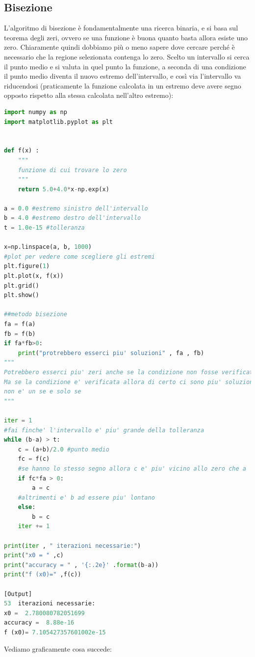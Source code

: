 \documentclass[10pt,a4paper]{article}
\begin{document}
\subsection{Bisezione}
L'algoritmo di bisezione è fondamentalmente una ricerca binaria, e si basa sul teorema degli zeri, ovvero se una funzione è buona quanto basta allora esiste uno zero. Chiaramente quindi dobbiamo più o meno sapere dove cercare perché è necessario che la regione selezionata contenga lo zero. Scelto un intervallo si cerca il punto medio e si valuta in quel punto la funzione, a seconda di una condizione il punto medio diventa il nuovo estremo dell'intervallo, e così via l'intervallo va riducendosi (praticamente la funzione calcolata in un estremo deve avere segno opposto rispetto alla stessa calcolata nell'altro estremo):


\begin{lstlisting}[language=Python]
import numpy as np
import matplotlib.pyplot as plt


def f(x) :
    """
    funzione di cui trovare lo zero
    """
    return 5.0+4.0*x-np.exp(x)

a = 0.0 #estremo sinistro dell'intervallo
b = 4.0 #estremo destro dell'intervallo
t = 1.0e-15 #tolleranza

x=np.linspace(a, b, 1000)
#plot per vedere come scegliere gli estremi
plt.figure(1)
plt.plot(x, f(x))
plt.grid()
plt.show()

##metodo bisezione
fa = f(a)
fb = f(b)
if fa*fb>0:
    print("protrebbero esserci piu' soluzioni" , fa , fb)
"""
Potrebbero esserci piu' zeri anche se la condizione non fosse verificata
Ma se la condizione e' verificata allora di certo ci sono piu' soluzioni
non e' un se e solo se
"""

iter = 1
#fai finche' l'intervallo e' piu' grande della tolleranza
while (b-a) > t:
    c = (a+b)/2.0 #punto medio 
    fc = f(c)
    #se hanno lo stesso segno allora c e' piu' vicino allo zero che a
    if fc*fa > 0:
        a = c
    #altrimenti e' b ad essere piu' lontano
    else:
        b = c
    iter += 1

print(iter , " iterazioni necessarie:")
print("x0 = " ,c)
print("accuracy = " , '{:.2e}' .format(b-a))
print("f (x0)=" ,f(c))

[Output]
53  iterazioni necessarie:
x0 =  2.780080782051699
accuracy =  8.88e-16
f (x0)= 7.105427357601002e-15
\end{lstlisting}

Vediamo graficamente cosa succede:
\end{document}
